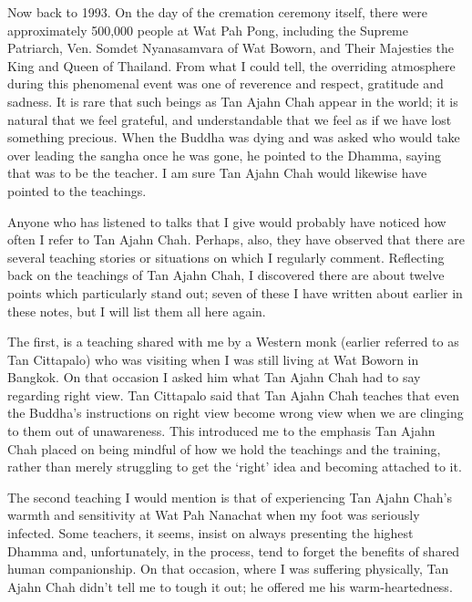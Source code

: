Now back to 1993. On the day of the cremation ceremony itself, there
were approximately 500,000 people\cite{cremation}
at Wat Pah Pong, including the Supreme Patriarch, Ven.
Somdet Nyanasamvara of Wat Boworn, and Their Majesties the King and
Queen of Thailand. From what I could tell, the overriding atmosphere
during this phenomenal event was one of reverence and respect, gratitude
and sadness. It is rare that such beings as Tan Ajahn Chah appear in the
world; it is natural that we feel grateful, and understandable that we
feel as if we have lost something precious. When the Buddha was dying
and was asked who would take over leading the sangha once he was gone,
he pointed to the Dhamma, saying that was to be the teacher. I am sure
Tan Ajahn Chah would likewise have pointed to the teachings.

Anyone who has listened to talks that I give\cite{talks}
would probably have noticed how often I refer to
Tan Ajahn Chah. Perhaps, also, they have observed that there are several
teaching stories or situations on which I regularly comment. Reflecting
back on the teachings of Tan Ajahn Chah, I discovered there are about
twelve points which particularly stand out; seven of these I have
written about earlier in these notes, but I will list them all here
again.

The first, is a teaching shared with me by a Western monk (earlier referred to
as Tan Cittapalo) who was visiting when I was still living at Wat Boworn in
Bangkok.
On that occasion I asked him what
Tan Ajahn Chah had to say regarding right view. Tan Cittapalo said that
Tan Ajahn Chah teaches that even the Buddha's instructions on right view
become wrong view when we are clinging to them out of unawareness. This
introduced me to the emphasis Tan Ajahn Chah placed on being mindful of
how we hold the teachings and the training, rather than merely
struggling to get the `right' idea and becoming attached to it.

The second teaching I would mention is that of experiencing Tan Ajahn
Chah's warmth and sensitivity at Wat Pah Nanachat when my foot was
seriously infected. Some teachers, it seems, insist on always presenting
the highest Dhamma and, unfortunately, in the process, tend to forget
the benefits of shared human companionship. On that occasion, where I
was suffering physically, Tan Ajahn Chah didn't tell me to tough it out;
he offered me his warm-heartedness.

